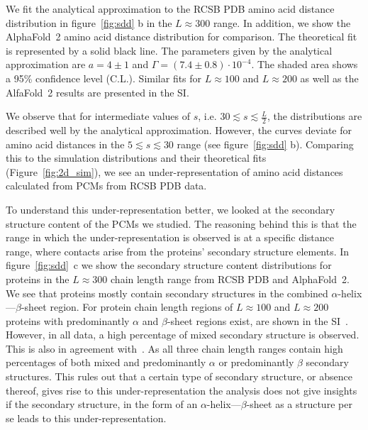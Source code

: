 \documentclass[10pt]{iopart}
\begin{document}
We fit the analytical approximation to the RCSB PDB amino acid distance distribution in figure~\ref{fig:sdd} b in the $L\approx300$ range. In addition, we show the AlphaFold~2 amino acid distance distribution for comparison. The theoretical fit is represented by a solid black line. The parameters given by the analytical approximation are $a=4 \pm 1$ and $\Gamma=(7.4 \pm 0.8)\cdot 10^{-4}$. The shaded area shows a 95\% confidence level (C.L.). Similar fits for $L\approx100$ and $L\approx200$ as well as the AlfaFold~2 results are presented in the SI.

We observe that for intermediate values of $s$, i.e. $30\lesssim s \lesssim \frac{L}{2}$, the distributions are described well by the analytical approximation. However, the curves deviate for amino acid distances in the $5\lesssim s \lesssim 30$ range (see figure~\ref{fig:sdd} b). Comparing this to the simulation distributions and their theoretical fits (Figure~\ref{fig:2d_sim}), we see an under-representation of amino acid distances calculated from PCMs from RCSB PDB data. 

To understand this under-representation better, we looked at the secondary structure content of the PCMs we studied. The reasoning behind this is that the range in which the under-representation is observed is at a specific distance range, where contacts arise from the proteins' secondary structure elements. In figure~\ref{fig:sdd}~c we show the secondary structure content distributions for proteins in the $L\approx300$ chain length range from RCSB PDB and AlphaFold~2. We see that proteins mostly contain secondary structures in the combined $\alpha$-helix---$\beta$-sheet region. For protein chain length regions of $L\approx100$ and $L\approx200$ proteins with predominantly $\alpha$ and $\beta$-sheet regions exist, are shown in the SI~\cite{SI}. However, in all data, a high percentage of mixed secondary structure is observed. This is also in agreement with~\cite{michie1996analysis}. As all three chain length ranges contain high percentages of both mixed and predominantly $\alpha$ or predominantly $\beta$ secondary structures. This rules out that a certain type of secondary structure, or absence thereof, gives rise to this under-representation the analysis does not give insights if the secondary structure, in the form of an $\alpha$-helix---$\beta$-sheet as a structure per se leads to this under-representation.
\end{document}
